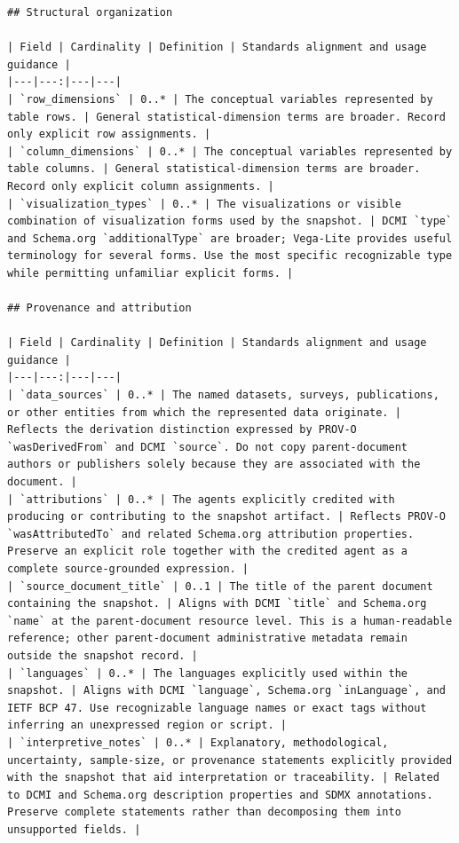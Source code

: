 \documentclass{article}
\begin{document}
\begin{lstlisting}
## Structural organization

| Field | Cardinality | Definition | Standards alignment and usage guidance |
|---|---:|---|---|
| `row_dimensions` | 0..* | The conceptual variables represented by table rows. | General statistical-dimension terms are broader. Record only explicit row assignments. |
| `column_dimensions` | 0..* | The conceptual variables represented by table columns. | General statistical-dimension terms are broader. Record only explicit column assignments. |
| `visualization_types` | 0..* | The visualizations or visible combination of visualization forms used by the snapshot. | DCMI `type` and Schema.org `additionalType` are broader; Vega-Lite provides useful terminology for several forms. Use the most specific recognizable type while permitting unfamiliar explicit forms. |

## Provenance and attribution

| Field | Cardinality | Definition | Standards alignment and usage guidance |
|---|---:|---|---|
| `data_sources` | 0..* | The named datasets, surveys, publications, or other entities from which the represented data originate. | Reflects the derivation distinction expressed by PROV-O `wasDerivedFrom` and DCMI `source`. Do not copy parent-document authors or publishers solely because they are associated with the document. |
| `attributions` | 0..* | The agents explicitly credited with producing or contributing to the snapshot artifact. | Reflects PROV-O `wasAttributedTo` and related Schema.org attribution properties. Preserve an explicit role together with the credited agent as a complete source-grounded expression. |
| `source_document_title` | 0..1 | The title of the parent document containing the snapshot. | Aligns with DCMI `title` and Schema.org `name` at the parent-document resource level. This is a human-readable reference; other parent-document administrative metadata remain outside the snapshot record. |
| `languages` | 0..* | The languages explicitly used within the snapshot. | Aligns with DCMI `language`, Schema.org `inLanguage`, and IETF BCP 47. Use recognizable language names or exact tags without inferring an unexpressed region or script. |
| `interpretive_notes` | 0..* | Explanatory, methodological, uncertainty, sample-size, or provenance statements explicitly provided with the snapshot that aid interpretation or traceability. | Related to DCMI and Schema.org description properties and SDMX annotations. Preserve complete statements rather than decomposing them into unsupported fields. |


\end{lstlisting}
\end{document}
